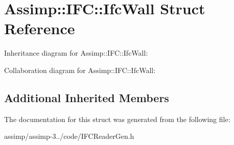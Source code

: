 \hypertarget{struct_assimp_1_1_i_f_c_1_1_ifc_wall}{\section{Assimp\+:\+:I\+F\+C\+:\+:Ifc\+Wall Struct Reference}
\label{struct_assimp_1_1_i_f_c_1_1_ifc_wall}
}


Inheritance diagram for Assimp\+:\+:I\+F\+C\+:\+:Ifc\+Wall\+:


Collaboration diagram for Assimp\+:\+:I\+F\+C\+:\+:Ifc\+Wall\+:
\subsection*{Additional Inherited Members}


The documentation for this struct was generated from the following file\+:\begin{DoxyCompactItemize}
\item 
assimp/assimp-\/3../code/I\+F\+C\+Reader\+Gen.\+h\end{DoxyCompactItemize}
